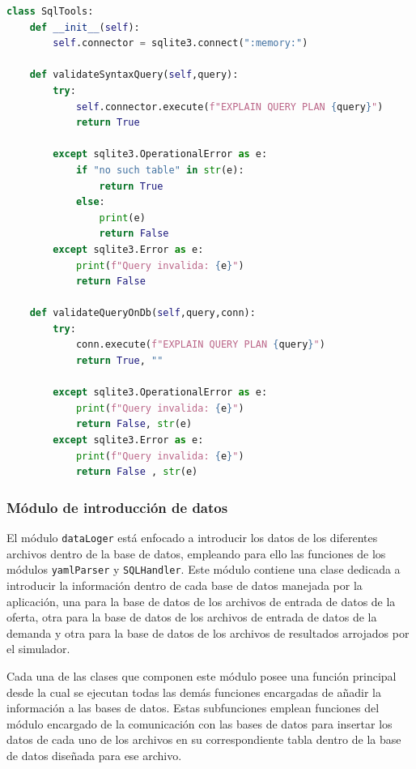 \begin{lstlisting}[language=Python,
                   style=python,
                   frame=none,
                   numbers=none,
                   basicstyle=\ttfamily\normalsize,
                   caption={Clase \texttt{SqlTools}},
                   label=src:classSqlTools,
                   inputencoding=utf8]                   
class SqlTools:
    def __init__(self):
        self.connector = sqlite3.connect(":memory:")

    def validateSyntaxQuery(self,query):
        try:
            self.connector.execute(f"EXPLAIN QUERY PLAN {query}")
            return True

        except sqlite3.OperationalError as e:
            if "no such table" in str(e):
                return True
            else:
                print(e)
                return False
        except sqlite3.Error as e:
            print(f"Query invalida: {e}")
            return False

    def validateQueryOnDb(self,query,conn):
        try:
            conn.execute(f"EXPLAIN QUERY PLAN {query}")
            return True, ""

        except sqlite3.OperationalError as e:
            print(f"Query invalida: {e}")
            return False, str(e)
        except sqlite3.Error as e:
            print(f"Query invalida: {e}")
            return False , str(e)
\end{lstlisting}

\subsubsection{Módulo de introducción de datos}

El módulo \texttt{dataLoger} está enfocado a introducir los datos de los diferentes archivos dentro de la base de datos, empleando para ello las funciones de los módulos \texttt{yamlParser} y \texttt{SQLHandler}. Este módulo contiene una clase dedicada a introducir la información dentro de cada base de datos manejada por la aplicación, una para la base de datos de los archivos de entrada de datos de la oferta, otra para la base de datos de los archivos de entrada de datos de la demanda y otra para la base de datos de los archivos de resultados arrojados por el simulador.

Cada una de las clases que componen este módulo posee una función principal desde la cual se ejecutan todas las demás funciones encargadas de añadir la información a las bases de datos. Estas subfunciones emplean funciones del módulo encargado de la comunicación con las bases de datos para insertar los datos de cada uno de los archivos en su correspondiente tabla dentro de la base de datos diseñada para ese archivo.

